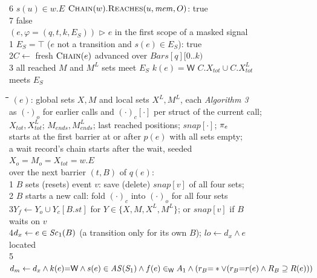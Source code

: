 \begin{figure}[tp]
\begin{minipage}[t]{0.49\textwidth}
\begin{tabbing}
6\>\> $s(u) \in w.E$  $\textsc{Chain}(w).\textsc{Reaches}(u,\mathit{mem},O)$:  true \\
7\> false \\[3pt]
 $(e, \varphi = (q, t, k, E_S))$ \quad $\triangleright$ $e$ in the first scope of a masked signal \\
1\> $E_S = \top$  ($e$ not a transition and $s(e) \in E_S$):  true \\
2\>$C \gets$ fresh $\textsc{Chain}(e)$ advanced over $\mathit{Bars}[q][0..k)$ \\
3\> all reached $M$ and $M^L$ sets meet $E_S$  $k(e){=}\mathsf{W}$  $C.X_{\mathit{tot}} \cup C.X^L_{\mathit{tot}}$ meets $E_S$
\end{tabbing}
\end{minipage}\hfill
\begin{minipage}[t]{0.49\textwidth}
\begin{tabbing}
\quad\=\quad\=\quad\=\quad\=\quad\=\kill
{} $(e)$: global sets $X, M$ and local sets $X^L, M^L$, each \hfill \emph{Algorithm 3} \\
\>as $(\cdot)_o$ for earlier calls and $(\cdot)_c[\cdot]$ per struct of the current call; \\
\>$X_{\mathit{tot}}, X^L_{\mathit{tot}}$; $M_{\mathit{ends}}, M^L_{\mathit{ends}}$; last reached positions; $\mathit{snap}[\cdot]$; $\pi_e$ \\
\>starts at the first barrier at or after $p(e)$ with all sets empty; \\
\>a wait record's chain starts after the wait, seeded $X_o = M_o = X_{\mathit{tot}} = w.E$ \\
  over the next barrier $(t, B)$ of $q(e)$: \\
1\> $B$ sets (resets) event $v$: save (delete) $\mathit{snap}[v]$ of all four sets;  \\
2\> $B$ starts a new call: fold $(\cdot)_c$ into $(\cdot)_o$ for all four sets \\
3\>$Y_f \gets Y_o \cup Y_c[B.\mathit{st}]$ for $Y \in \{X, M, X^L, M^L\}$; or $\mathit{snap}[v]$ if $B$ waits on $v$ \\
4\>$d_x \gets e \in \mathit{Sc}_{1}(B)$ (a transition only for its own $B$); $\mathit{lo} \gets d_x \wedge e$ located \\
5\>$d_m \gets d_x \wedge k(e){=}\mathsf{W} \wedge s(e) \in \mathit{AS}(S_1) \wedge f(e) \in_{\mathsf{W}} A_1 \wedge (r_B{=}\ast \vee (r_B{=}r(e) \wedge R_B \supseteq R(e)))$ \\

\end{tabbing}
\end{minipage}
\end{figure}
